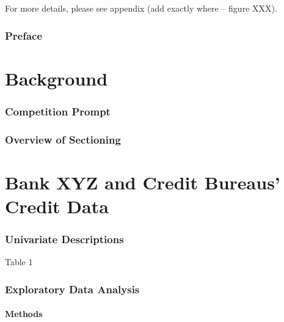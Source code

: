 \documentclass[
]{article}
\begin{document}
For more details, please see appendix (add exactly where -- figure XXX).

\newpage

\hypertarget{preface}{%
\section*{Preface}\label{preface}}

\newpage

\hypertarget{part-background}{%
\part{Background}\label{part-background}}

\hypertarget{competition-prompt}{%
\section{Competition Prompt}\label{competition-prompt}}

\hypertarget{overview-of-sectioning}{%
\section{Overview of Sectioning}\label{overview-of-sectioning}}

\newpage

\hypertarget{part-bank-xyz-and-credit-bureaus-credit-data}{%
\part{Bank XYZ and Credit Bureaus' Credit Data}\label{part-bank-xyz-and-credit-bureaus-credit-data}}

\hypertarget{univariate-descriptions}{%
\section{Univariate Descriptions}\label{univariate-descriptions}}

Table 1

\hypertarget{exploratory-data-analysis}{%
\section{Exploratory Data Analysis}\label{exploratory-data-analysis}}

\hypertarget{methods}{%
\subsection{Methods}\label{methods}}
\end{document}
